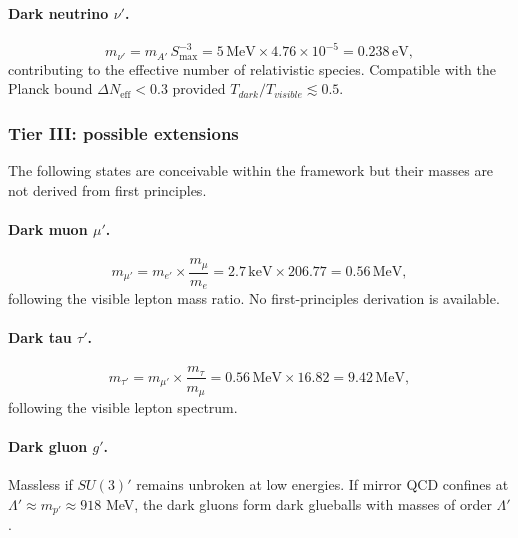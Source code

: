 \documentclass[a4paper,7pt,oneside,openany]{book}
\begin{document}
\paragraph{Dark neutrino \texorpdfstring{$\nu'$}{nu'}.}
\begin{equation}
m_{\nu'}
=
m_{A'}\,S_{\max}^{-3}
=
5\,\text{MeV}\times 4.76\times 10^{-5}
=
0.238\,\text{eV},
\label{eq:mnu'-tier2}
\end{equation}
contributing to the effective number of relativistic species. 
Compatible with the Planck bound $\Delta N_{\text{eff}}<0.3$ 
provided $T_{dark}/T_{visible}\lesssim 0.5$.

\subsubsection{Tier III: possible extensions}

The following states are conceivable within the framework but 
their masses are not derived from first principles.

\paragraph{Dark muon \texorpdfstring{$\mu'$}{mu'}.}
\begin{equation}
m_{\mu'}
=
m_{e'}\times\frac{m_{\mu}}{m_{e}}
=
2.7\,\text{keV}\times 206.77
=
0.56\,\text{MeV},
\label{eq:mmu'-tier3}
\end{equation}
following the visible lepton mass ratio. No first-principles 
derivation is available.

\paragraph{Dark tau \texorpdfstring{$\tau'$}{tau'}.}
\begin{equation}
m_{\tau'}
=
m_{\mu'}\times\frac{m_{\tau}}{m_{\mu}}
=
0.56\,\text{MeV}\times 16.82
=
9.42\,\text{MeV},
\label{eq:mtau'-tier3}
\end{equation}
following the visible lepton spectrum.

\paragraph{Dark gluon \texorpdfstring{$g'$}{g'}.}
Massless if $SU(3)'$ remains unbroken at low energies. If mirror 
QCD confines at $\Lambda'\approx m_{p'}\approx 918$ MeV, the dark 
gluons form dark glueballs with masses of order $\Lambda'$.
\end{document}
